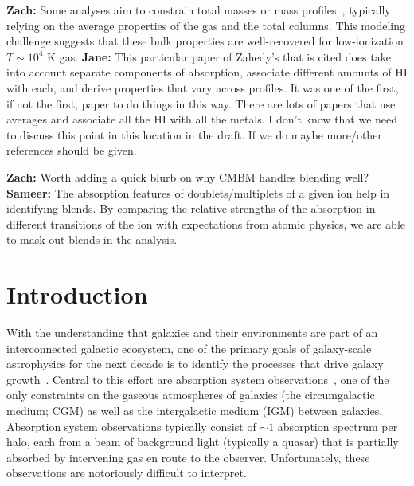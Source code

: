 \documentclass[fleqn,usenatbib]{mnras}
\begin{document}
\textbf{Zach:}
Some analyses aim to constrain total masses or mass profiles~\citep[e.g.][]{zahedy2019Characterizing}, typically relying on the average properties of the gas and the total columns.
This modeling challenge suggests that these bulk properties are well-recovered for low-ionization $T \sim 10^4$ K gas.
\textbf{Jane:}
This particular paper of Zahedy's that is cited does take into account separate components of absorption, associate different amounts of HI with each, and derive properties that vary across profiles. It was one of the first, if not the first, paper to do things in this way. There are lots of papers that use averages and associate all the HI with all the metals.  I don't know that we need to discuss this point in this location in the draft.  If we do maybe more/other references should be given.

\textbf{Zach:}
Worth adding a quick blurb on why CMBM handles blending well?
\textbf{Sameer:}
The absorption features of doublets/multiplets of a given ion help in identifying blends. By comparing the relative strengths of the absorption in different transitions of the ion with expectations from atomic physics, we are able to mask out blends in the analysis.

\section{Introduction}

With the understanding that galaxies and their environments are part of an interconnected galactic ecosystem, one of the primary goals of galaxy-scale astrophysics for the next decade is to identify the processes that drive galaxy growth~\citep{Decadal2020}.
Central to this effort are absorption system observations~\citep[e.g.][]{bahcall1993Hubble, lanzetta1995Gaseous, lauroesch1996QSO, Charlton1996,churchill1996Spatial,Prochaska1997,Rauch1997,Tumlinson2013,Werk2014,Prochaska2017,Kacprzak2019,Lehner2020}, one of the only constraints on the gaseous atmospheres of galaxies (the circumgalactic medium; CGM) as well as the intergalactic medium (IGM) between galaxies.
Absorption system observations typically consist of $\sim 1$ absorption spectrum per halo, each from a beam of background light (typically a quasar) that is partially absorbed by intervening gas en route to the observer.
Unfortunately, these observations are notoriously difficult to interpret.
\end{document}
